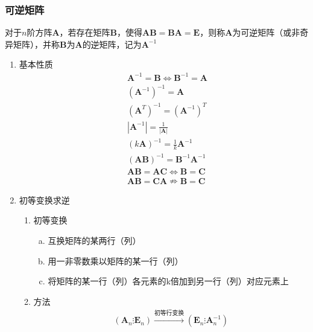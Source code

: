 \documentclass[12pt]{book}
\begin{document}
\subsubsection{可逆矩阵}


对于$n$阶方阵$\bm{A}$，若存在矩阵$\bm{B}$，使得$\bm{AB}=\bm{BA}=\bm{E}$，则称$\bm{A}$为可逆矩阵（或非奇异矩阵），并称$\bm{B}$为$\bm{A}$的逆矩阵，记为$\bm{A}^{-1}$

\begin{enumerate}[1.]
    \item 基本性质
    \begin{align*}
               & \bm{A}^{-1}=\bm{B} \Leftrightarrow \bm{B}^{-1}=\bm{A} \\
               & (\bm{A}^{-1})^{-1} = \bm{A}                           \\
               & (\bm{A}^{T})^{-1} = (\bm{A}^{-1})^{T}                 \\
               & |\bm{A}^{-1}| = \frac{1}{|\bm{A}|}                    \\
               & (k \mathbf{A})^{-1} = \frac{1}{k} \mathbf{A}^{-1}     \\
               & (\bm{AB})^{-1} = \bm{B}^{-1} \bm{A}^{-1}              \\
               & \bm{AB}=\bm{AC} \Leftrightarrow \bm{B}=\bm{C}         \\
               & \bm{AB}=\bm{CA}\nRightarrow \bm{B}=\bm{C}
          \end{align*}
    \item 初等变换求逆
          \begin{enumerate}[(1)]
              \item 初等变换
                    \begin{enumerate}[a.]
                        \item 互换矩阵的某两行（列）
                        \item 用一非零数乘以矩阵的某一行（列）
                        \item 将矩阵的某一行（列）各元素的k倍加到另一行（列）对应元素上
                    \end{enumerate}
              \item 方法
                    \begin{gather*}
                        (\bm{A}_{n}\vdots \bm{E}_{n})\xrightarrow{初等行变换}(\bm{E}_{n}\vdots\bm{A}^{-1}_{n})
                    \end{gather*}
          \end{enumerate}

\end{enumerate}
\end{document}
